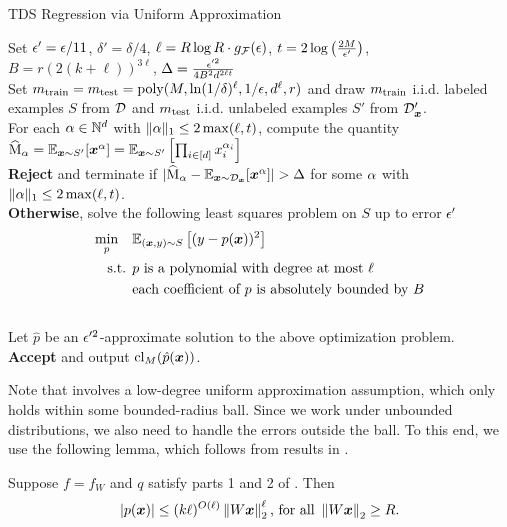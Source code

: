 \documentclass[11pt]{article} %
\numberwithin{equation}{section}
\begin{document}
\begin{algorithm}
\caption{TDS Regression via Uniform Approximation}\label{algorithm:uniform-approx}
Set ${\epsilon}' = \epsilon/11$, $\delta' = \delta/4$, $\ell = R \log R \cdot g_{\mathcal{F}}(\epsilon)$, $t = 2\log \left( \frac{2M}{\epsilon'} \right)$, $B = r(2(k + \ell))^{3\ell}$, $\Delta=\frac{\epsilon'^2}{4B^2 d^{2\ell t}}$ \\
Set $m_{\mathrm{train}} = m_{\mathrm{test}} = \mathrm{poly}(M, \ln(1/\delta)^\ell, 1/\epsilon, d^\ell, r)$ and draw $m_{\mathrm{train}}$ i.i.d. labeled examples $S$ from ${\mathcal{D}}$ and $m_{\mathrm{test}}$ i.i.d. unlabeled examples $S'$ from ${\mathcal{D}}_{{\bm{x}}}'$. \\
For each $\alpha \in \mathbb{N}^d$ with $\|\alpha\|_1 \le 2\max(\ell, t)$, compute the quantity 
$\widehat{\mathrm{M}}_\alpha = \mathbb{E}_{{\bm{x}}\sim S'} [{\bm{x}}^\alpha] = \mathbb{E}_{{\bm{x}}\sim S'} \left[ \prod_{i\in[d]}x_i^{\alpha_i} \right]$ \\
\textbf{Reject} and terminate if $|\momentempirical_\mindex-\E_{\x\sim \Dtrainx}[\x^\mindex]|>\mslack$ for some $\alpha$ with $\|\alpha\|_1 \le 2\max(\ell, t)$. \\
\textbf{Otherwise}, solve the following least squares problem on $S$ up to error ${\epsilon}'$
\begin{align*}
    \min_p \quad &\mathbb{E}_{({\bm{x}},y)\sim S}\left[ (y-p({\bm{x}}))^2 \right] \\
    \text{s.t. } &p \text{ is a polynomial with degree at most }\ell \\
    &\text{each coefficient of }p \text{ is absolutely bounded by }B
\end{align*}
\\
Let $\hat{p}$ be an ${\epsilon}'^2$-approximate solution to the above optimization problem. \\
\textbf{Accept} and output $\mathrm{cl}_M(\hat p({\bm{x}}))$.
\end{algorithm}

Note that  involves a low-degree uniform approximation assumption, which only holds within some bounded-radius ball. Since we work under unbounded distributions, we also need to handle the errors outside the ball. To this end, we use the following lemma, which follows from results in \cite{ben2018classical}.

\begin{lemma}\label{lemma:poly-bnd}
    Suppose $f=f_W$ and $q$ satisfy parts 1 and 2 of . Then
    \[|p({\bm{x}})| \le (k\ell)^{O(\ell)} \left\| {W{\bm{x}}} \right\|_2^\ell \text{, for all } \left\| W{\bm{x}} \right\|_2 \ge R.\]
\end{lemma}
\end{document}
